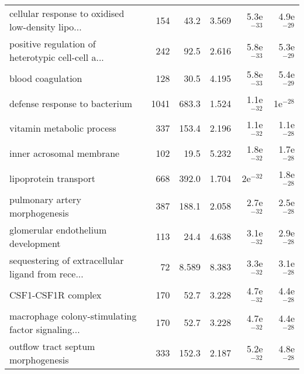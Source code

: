\begin{longtable}{lrrrrr}
 cellular response to oxidised low-density lipo... &                     154 &                    43.2 &      3.569 &         5.3e$^{-33}$ &         4.9e$^{-29}$ \\
 positive regulation of heterotypic cell-cell a... &                     242 &                    92.5 &      2.616 &         5.8e$^{-33}$ &         5.3e$^{-29}$ \\
                                 blood coagulation &                     128 &                    30.5 &      4.195 &         5.8e$^{-33}$ &         5.4e$^{-29}$ \\
                     defense response to bacterium &                    1041 &                   683.3 &      1.524 &         1.1e$^{-32}$ &           1e$^{-28}$ \\
                         vitamin metabolic process &                     337 &                   153.4 &      2.196 &         1.1e$^{-32}$ &         1.1e$^{-28}$ \\
                          inner acrosomal membrane &                     102 &                    19.5 &      5.232 &         1.8e$^{-32}$ &         1.7e$^{-28}$ \\
                             lipoprotein transport &                     668 &                   392.0 &      1.704 &           2e$^{-32}$ &         1.8e$^{-28}$ \\
                    pulmonary artery morphogenesis &                     387 &                   188.1 &      2.058 &         2.7e$^{-32}$ &         2.5e$^{-28}$ \\
                glomerular endothelium development &                     113 &                    24.4 &      4.638 &         3.1e$^{-32}$ &         2.9e$^{-28}$ \\
 sequestering of extracellular ligand from rece... &                      72 &                   8.589 &      8.383 &         3.3e$^{-32}$ &         3.1e$^{-28}$ \\
                                CSF1-CSF1R complex &                     170 &                    52.7 &      3.228 &         4.7e$^{-32}$ &         4.4e$^{-28}$ \\
 macrophage colony-stimulating factor signaling... &                     170 &                    52.7 &      3.228 &         4.7e$^{-32}$ &         4.4e$^{-28}$ \\
                outflow tract septum morphogenesis &                     333 &                   152.3 &      2.187 &         5.2e$^{-32}$ &         4.8e$^{-28}$ \\

\end{longtable}
